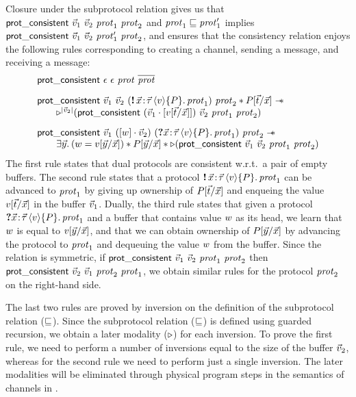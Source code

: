 Closure under the subprotocol relation gives us that
$\mathsf{prot\_consistent}\ \vec{v}_1\ \vec{v}_2\ \mathit{prot}_1\ \mathit{prot}_2$ and $\mathit{prot}_1 \sqsubseteq \mathit{prot}_1'$
implies $\mathsf{prot\_consistent}\ \vec{v}_1\ \vec{v}_2\ \mathit{prot}_1'\ \mathit{prot}_2$, %
and ensures that the consistency relation enjoys the following rules
corresponding to creating a channel, sending a message, and receiving a message:
%
\begin{align*}
& \proteval \nil \nil {\prot} {\dual \prot}
\\[0.5em]
& \begin{array}{@{} l @{}}
  \proteval \vsl \vsr {(\sendprot \xdots \val \iprop {\prot_1})} {\prot_2}
    \ast \subst \iprop {\vec\var} {\vec\term} \wand \\
  \qquad
  \lateropt {\listlength \vsr} (
    \proteval {(\snoc {\subst \val {\vec\var} {\vec\term}} \vsl)} \vsr {\prot_1} {\prot_2})
  \end{array} \\[0.5em]
& \begin{array}{@{} l @{}}
  \proteval \vsl {(\cons \valB \vsr)} {(\recvprot \xdots \val \iprop {\prot_1})} {\prot_2}
  \wand \\
  \qquad
  \Exists \vec\varB.
    (\valB = \subst \val {\vec\var} {\vec\varB}) *
    \subst \iprop {\vec\var} {\vec\varB} \ast
    \later (\proteval \vsl \vsr {\prot_1} {\prot_2})
  \end{array}
\end{align*}
%
The first rule states that dual protocols are consistent w.r.t.\ a pair of
empty buffers.
The second rule states that a protocol $\sendprot \xdots \val \iprop {\prot_1}$
can be advanced to $\mathit{prot}_1$ by giving up ownership of
${P}[{\vec{t}} / {\vec{x}}]$ and enqueing the value
${v}[{\vec{t}} / {\vec{x}}]$ in the buffer $\vec{v}_1$.
Dually, the third rule states that given a protocol
$\recvprot \xdots \val \iprop {\prot_1}$ and a buffer that contains value
$w$ as its head, we learn that $w$ is equal to
${v}[{\vec{y}} / {\vec{x}}]$, and that we can obtain ownership of
${P}[{\vec{y}} / {\vec{x}}]$ by advancing the protocol to $\mathit{prot}_1$
and dequeuing the value $w$ from the buffer.
Since the relation is symmetric, \ie if $\mathsf{prot\_consistent}\ \vec{v}_1\ \vec{v}_2\ \mathit{prot}_1\ \mathit{prot}_2$
then $\mathsf{prot\_consistent}\ \vec{v}_2\ \vec{v}_1\ \mathit{prot}_2\ \mathit{prot}_1$, we obtain similar rules for
the protocol $\mathit{prot}_2$ on the right-hand side.

The last two rules are proved by inversion on the definition of the subprotocol
relation ($\sqsubseteq$).
Since the subprotocol relation ($\sqsubseteq$) is defined using guarded recursion,
we obtain a later modality ($\mathop{{\triangleright}}$) for each inversion.
To prove the first rule, we need to perform a number of inversions equal to the
size of the buffer $\vec{v}_2$, whereas for the second rule we need to perform
just a single inversion.
The later modalities will be eliminated through physical program steps in
the semantics of channels in .

